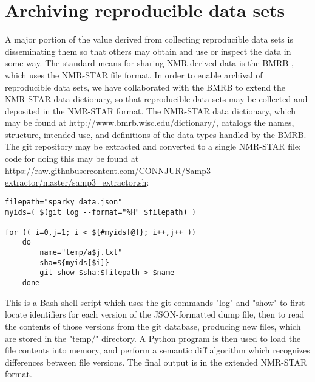 \section{Archiving reproducible data sets}
A major portion of the value derived from collecting reproducible data sets
is disseminating them so that others may obtain and use or inspect the data
in some way.  The standard means for sharing NMR-derived data is the BMRB
\cite{bmrb}, which uses the NMR-STAR file format.  In order to enable archival
of reproducible data sets, we have collaborated with the BMRB to extend the
NMR-STAR data dictionary, so that reproducible data sets may be collected and
deposited in the NMR-STAR format.
The NMR-STAR data dictionary, which may be found at 
\url{http://www.bmrb.wisc.edu/dictionary/}, catalogs the names, structure,
intended use, and definitions of the data types handled by the BMRB.
The git repository may be extracted and converted to a single NMR-STAR file;
code for doing this may be found at 
\url{https://raw.githubusercontent.com/CONNJUR/Samp3-extractor/master/samp3_extractor.sh}:
\begin{verbatim}
filepath="sparky_data.json"
myids=( $(git log --format="%H" $filepath) )
 
for (( i=0,j=1; i < ${#myids[@]}; i++,j++ )) 
    do
        name="temp/a$j.txt"
        sha=${myids[$i]}
        git show $sha:$filepath > $name
    done
\end{verbatim}
This is a Bash shell script which uses the git commands "log" and "show" to 
first locate identifiers for
each version of the JSON-formatted dump file, then to read the contents of
those versions from the git database, producing new files, which are stored
in the "temp/" directory.  A Python program is then used to load the file
contents into memory, and perform a semantic diff algorithm which recognizes
differences between file versions.  The final output is in the extended
NMR-STAR format.




